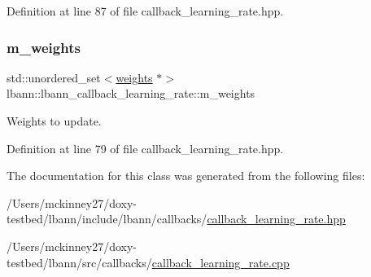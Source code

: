 Definition at line 87 of file callback\+\_\+learning\+\_\+rate.\+hpp.

\mbox{\label{classlbann_1_1lbann__callback__learning__rate_a0b02e82190e04a22ab26d858041915d7}} 
\subsubsection{\texorpdfstring{m\+\_\+weights}{m\_weights}}
{\footnotesize\ttfamily std\+::unordered\+\_\+set$<$\hyperlink{classlbann_1_1weights}{weights} $\ast$$>$ lbann\+::lbann\+\_\+callback\+\_\+learning\+\_\+rate\+::m\+\_\+weights\hspace{0.3cm}{\ttfamily [protected]}}

Weights to update. 

Definition at line 79 of file callback\+\_\+learning\+\_\+rate.\+hpp.



The documentation for this class was generated from the following files\+:\begin{DoxyCompactItemize}
\item 
/\+Users/mckinney27/doxy-\/testbed/lbann/include/lbann/callbacks/\hyperlink{callback__learning__rate_8hpp}{callback\+\_\+learning\+\_\+rate.\+hpp}\item 
/\+Users/mckinney27/doxy-\/testbed/lbann/src/callbacks/\hyperlink{callback__learning__rate_8cpp}{callback\+\_\+learning\+\_\+rate.\+cpp}\end{DoxyCompactItemize}
